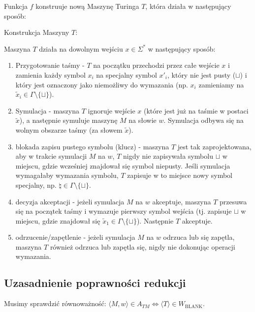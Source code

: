\documentclass{article}
\begin{document}
Funkcja $f$ konstruuje nową Maszynę Turinga $T$, która działa w następujący sposób:

Konstrukcja Maszyny $T$:

Maszyna $T$ działa na dowolnym wejściu $x \in \Sigma^*$ w następujący sposób:
\begin{enumerate}
    \item Przygotowanie taśmy - $T$ na początku przechodzi przez całe wejście $x$ i zamienia każdy symbol $x_i$ na specjalny symbol $x'_i$, który nie jest pusty ($\sqcup$) i który jest oznaczony jako niemożliwy do wymazania (np. $x_i$ zamieniamy na $\tilde{x}_i \in \Gamma \setminus \{\sqcup\}$).
    \item Symulacja - maszyna $T$ ignoruje wejście $x$ (które jest już na taśmie w postaci $\tilde{x}$), a następnie symuluje maszynę $M$ na słowie $w$. Symulacja odbywa się na wolnym obszarze taśmy (za słowem $\tilde{x}$).
    \item blokada zapisu pustego symbolu (klucz) -  maszyna $T$ jest tak zaprojektowana, aby w trakcie symulacji $M$ na $w$, $T$ nigdy nie zapisywała symbolu $\sqcup$ w miejscu, gdzie wcześniej znajdował się symbol niepusty. Jeśli symulacja wymagałaby wymazania symbolu, $T$ zapisuje w to miejsce nowy symbol specjalny, np. $\natural \in \Gamma \setminus \{\sqcup\}$.
    \item decyzja akceptacji - jeżeli symulacja $M$ na $w$ akceptuje, maszyna $T$ przesuwa się na początek taśmy i wymazuje pierwszy symbol wejścia (tj. zapisuje $\sqcup$ w miejscu, gdzie znajdował się $\tilde{x}_1 \in \Gamma \setminus \{\sqcup\}$). Następnie $T$ akceptuje.
    \item odrzucenie/zapętlenie - jeżeli symulacja $M$ na $w$ odrzuca lub się zapętla, maszyna $T$ również odrzuca lub zapętla się, nigdy nie dokonując operacji wymazania.
\end{enumerate}

\subsection*{Uzasadnienie poprawności redukcji}

Musimy sprawdzić równoważność: $\langle M, w \rangle \in A_{TM} \iff \langle T \rangle \in W_{\mathrm{BLANK}}$.
\end{document}
